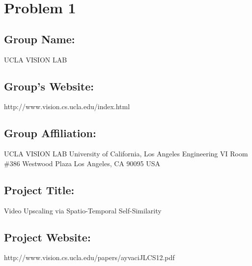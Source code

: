 \documentclass{article}
\begin{document}
\section*{Problem 1}
\subsection*{Group Name:} 

\begin{adjustwidth}{1cm}{}
	UCLA	VISION	LAB
\end{adjustwidth}

\subsection*{Group's Website:}

\begin{adjustwidth}{1cm}{}
	http://www.vision.cs.ucla.edu/index.html
\end{adjustwidth}

\subsection*{Group Affiliation:}

\begin{adjustwidth}{1cm}{}
	UCLA	VISION	LAB \newline
	University of California, Los Angeles \newline
	Engineering VI Room \#386  Westwood Plaza\newline
	Los Angeles, CA 90095\newline
	USA
\end{adjustwidth}

\subsection*{Project Title:}

\begin{adjustwidth}{1cm}{}
	Video Upscaling via Spatio-Temporal Self-Similarity
\end{adjustwidth}

\subsection*{Project Website:}

\begin{adjustwidth}{1cm}{}
	http://www.vision.cs.ucla.edu/papers/ayvaciJLCS12.pdf
\end{adjustwidth}
\end{document}
